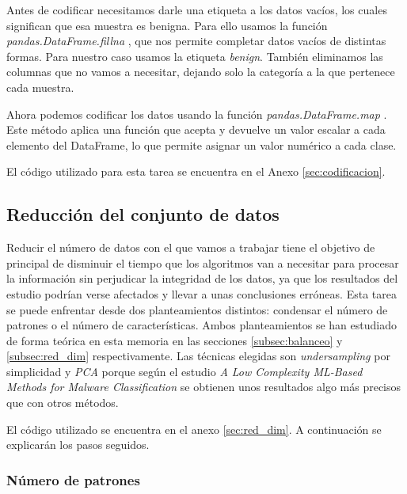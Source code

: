 Antes de codificar necesitamos darle una etiqueta a los datos vacíos, los cuales significan que esa muestra es benigna. Para ello usamos la función \textit{pandas.DataFrame.fillna} \cite{fillna}, que nos permite completar datos vacíos de distintas formas. Para nuestro caso usamos la etiqueta \textit{benign}. También eliminamos las columnas que no vamos a necesitar, dejando solo la categoría a la que pertenece cada muestra.

\vspace{1em}

Ahora podemos codificar los datos usando la función \textit{pandas.DataFrame.map} \cite{map}. Este método aplica una función que acepta y devuelve un valor escalar a cada elemento del DataFrame, lo que permite asignar un valor numérico a cada clase.

\vspace{1em}

El código utilizado para esta tarea se encuentra en el Anexo \ref{sec:codificacion}.

\subsection{Reducción del conjunto de datos}
\label{subsec:red_dataset}

Reducir el número de datos con el que vamos a trabajar tiene el objetivo de principal de disminuir el tiempo que los algoritmos van a necesitar para procesar la información sin perjudicar la integridad de los datos, ya que los resultados del estudio podrían verse afectados y llevar a unas conclusiones erróneas. Esta tarea se puede enfrentar desde dos planteamientos distintos: condensar el número de patrones o el número de características. Ambos planteamientos se han estudiado de forma teórica en esta memoria en las secciones \ref{subsec:balanceo} y \ref{subsec:red_dim} respectivamente. Las técnicas elegidas son \textit{undersampling} por simplicidad y \textit{PCA} porque según el estudio \textit{A Low Complexity ML-Based Methods for Malware Classification} \cite{red_dim_pca} se obtienen unos resultados algo más precisos que con otros métodos.

\vspace{1em}

El código utilizado se encuentra en el anexo \ref{sec:red_dim}. A continuación se explicarán los pasos seguidos.

\subsubsection{Número de patrones}
\label{subsubsec:num_patrones}

